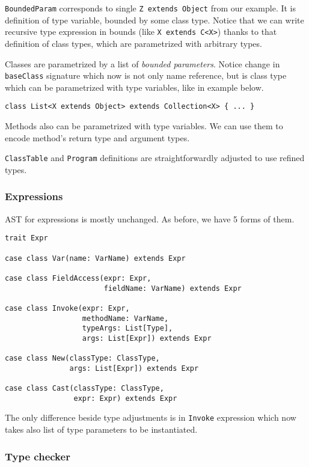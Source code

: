 \documentclass{article}[12pt]
\begin{document}
\texttt{BoundedParam} corresponds to single \texttt{Z extends Object} from our example. It is definition of type variable, bounded by some class type. Notice that we can write recursive type expression in bounds (like \texttt{X extends C<X>}) thanks to that definition of class types, which are parametrized with arbitrary types.

Classes are parametrized by a list of \emph{bounded parameters}. Notice change in \texttt{baseClass} signature which now is not only name reference, but is class type which can be parametrized with type variables, like in example below.

\begin{verbatim}
class List<X extends Object> extends Collection<X> { ... }
\end{verbatim}

Methods also can be parametrized with type variables. We can use them to encode method's return type and argument types.

\texttt{ClassTable} and \texttt{Program} definitions are straightforwardly adjusted to use refined types.

\subsubsection{Expressions}

AST for expressions is mostly unchanged. As before, we have 5 forms of them.

\begin{verbatim}
trait Expr

case class Var(name: VarName) extends Expr

case class FieldAccess(expr: Expr,
                       fieldName: VarName) extends Expr

case class Invoke(expr: Expr,
                  methodName: VarName,
                  typeArgs: List[Type],
                  args: List[Expr]) extends Expr

case class New(classType: ClassType,
               args: List[Expr]) extends Expr

case class Cast(classType: ClassType,
                expr: Expr) extends Expr
\end{verbatim}

The only difference beside type adjustments is in \texttt{Invoke} expression which now takes also list of type parameters to be instantiated.

\subsubsection{Type checker}
\end{document}

